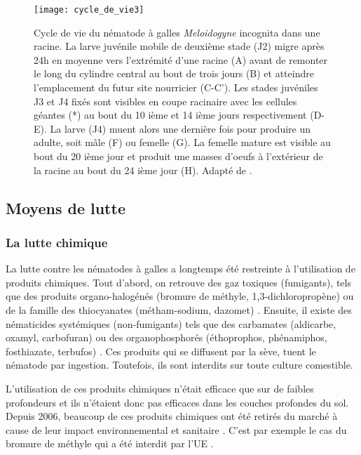 \begin{figure}
	\centering \texttt{[image: cycle\_de\_vie3]}
		\caption[Cycle de vie du nématode à galles \textit{Meloidogyne} \textit{incognita} dans une racine (Photos  
		Inrae Sophia Antipolis).]{Cycle de vie du nématode à galles \textit{Meloidogyne} incognita dans une racine.  La 
		larve juvénile mobile de deuxième stade  (J2)
      	migre après 24h  en moyenne vers l'extrémité d'une racine (A)  avant de remonter le long du cylindre central au  
      	bout de trois jours (B) et atteindre l’emplacement du futur site nourricier (C-C').
	    Les stades juvéniles J3  et J4  fixés sont visibles en coupe racinaire avec les cellules géantes (*)  au bout 
	    du 10 ième et 14 ième jours respectivement (D-E).%
	    La larve (J4) muent alors une dernière fois pour produire un adulte, soit  mâle (F) ou femelle (G). La femelle 
	    mature est visible au  bout du 20 ième jour et produit une masses d'oeufs  à l'extérieur de la racine au bout 
	    du 24 ième jour (H). Adapté de \citet{Abad2008}.}
	   \label{cycle}
\end{figure}

\newpage
 
\subsection{Moyens de lutte} \label{lutte}
	
\subsubsection{La lutte chimique}

	La lutte contre les nématodes à galles a longtemps été restreinte  à l'utilisation de produits chimiques.
Tout d'abord, on retrouve  des gaz toxiques (fumigants), tels que des produits
organo-halogénés (bromure de méthyle, 1,3-dichloropropène) ou de la famille des
thiocyanates (métham-sodium, dazomet) \citep{Wesemael2011}. Ensuite, il existe  des nématicides systémiques (non-fumigants) tels que
des carbamates (aldicarbe, oxamyl, carbofuran) ou des organophosphorés (éthoprophos,
phénamiphos, fosthiazate, terbufos) \citep{Cavelier1987}. Ces produits qui se diffusent par la sève, tuent le nématode par ingestion. Toutefois, ils sont interdits sur toute culture comestible.

	L'utilisation de ces produits chimiques n'était efficace que sur de faibles profondeurs et ils n'étaient donc pas efficaces dans les couches profondes du sol.
Depuis 2006, beaucoup de ces produits chimiques ont été retirés du marché à cause de leur impact environnemental et sanitaire \citep{Abad2010}. C'est par exemple le cas du  bromure de méthyle qui a été interdit par l'UE \citep*{MBTOC2006, ECDirective2009}. 

